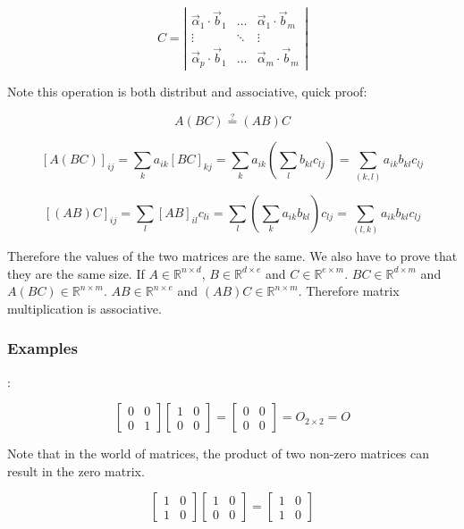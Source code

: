 \documentclass[11 pt, twoside]{article}
\begin{document}
\[
    C = \left|\begin{array}{ccc}
        \vec{\alpha}_1 \cdot \vec{b}_1 & \dots & \vec{\alpha}_1 \cdot
        \vec{b}_m\\
        \vdots & \ddots & \vdots\\
        \vec{\alpha}_p \cdot \vec{b}_1 & \dots & \vec{\alpha}_m \cdot
        \vec{b}_m
    \end{array}\right|
\]

Note this operation is both distribut and associative, quick proof:

$$A (BC) \overset{?}{=} (AB) C$$

$$[A(BC)]_{ij} = \sum_{k} a_{ik} [BC]_{kj} = \sum_k a_{ik} (\sum_l b_{kl} c_{lj})
= \sum_{(k, l)} a_{ik} b_{kl} c_{lj}$$

$$[(AB)C]_{ij} = \sum_l [AB]_{il} c_{li} = \sum_l(\sum_k a_{ik} b_{kl})c_{lj} =
\sum_{(l, k)} a_{ik} b_{kl} c_{lj}$$

Therefore the values of the two matrices are the same. We also have to prove
that they are the same size. If $A \in \mathbb{R}^{n \times d}$, $B \in
\mathbb{R}^{d \times e}$ and $C \in \mathbb{R}^{e \times m}$. $BC \in
\mathbb{R}^{d \times m}$ and $A(BC) \in \mathbb{R}^{n \times m}$. $AB \in
\mathbb{R}^{n \times e}$ and $(AB)C \in \mathbb{R}^{n \times m}$.
Therefore matrix multiplication is associative.

\subsubsection{Examples}:

\[
    \left[\begin{array}{cc}
        0 & 0 \\
        0 & 1
    \end{array}\right]
    \left[\begin{array}{cc}
        1 & 0 \\
        0 & 0
    \end{array}\right]
    =
    \left[\begin{array}{cc}
        0 & 0 \\
        0 & 0
    \end{array}\right]
    = O_{2 \times 2}
    = O
\]

Note that in the world of matrices, the product of two non-zero matrices can
result in the zero matrix.

\[
    \left[\begin{array}{cc}
        1 & 0 \\
        1 & 0
    \end{array}\right]
    \left[\begin{array}{cc}
        1 & 0 \\
        0 & 0
    \end{array}\right]
    =
    \left[\begin{array}{cc}
        1 & 0 \\
        1 & 0
    \end{array}\right]
\]
\end{document}
